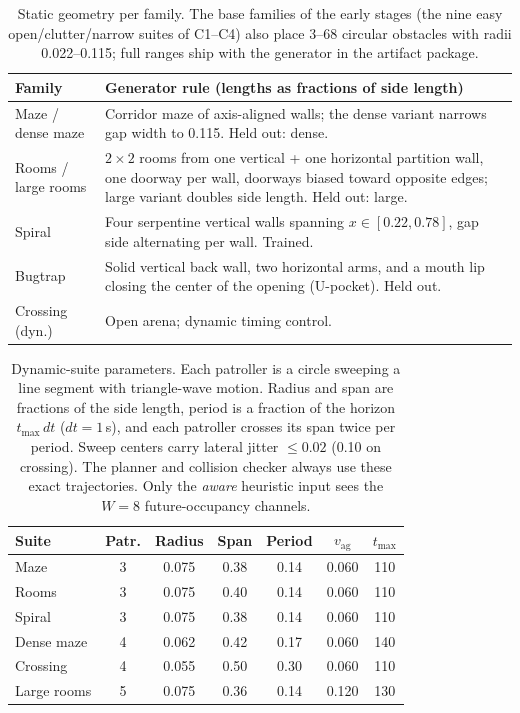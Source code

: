 \documentclass[letterpaper]{article} %
\newcommand{\stage}[1]{\textsc{#1}}
\begin{document}
\begin{table}[t]
\centering
\small
\setlength{\tabcolsep}{2.5pt}
\begin{tabular}{@{}lp{5.6cm}@{}}
\toprule
Family & Generator rule (lengths as fractions of side length) \\
\midrule
Maze / dense maze & Corridor maze of axis-aligned walls; the dense variant narrows gap width to 0.115. Held out: dense. \\
Rooms / large rooms & $2{\times}2$ rooms from one vertical + one horizontal partition wall, one doorway per wall, doorways biased toward opposite edges; large variant doubles side length. Held out: large. \\
Spiral & Four serpentine vertical walls spanning $x \in [0.22, 0.78]$, gap side alternating per wall. Trained. \\
Bugtrap & Solid vertical back wall, two horizontal arms, and a mouth lip closing the center of the opening (U-pocket). Held out. \\
Crossing (dyn.) & Open arena; dynamic timing control. \\
\bottomrule
\end{tabular}
\caption{Static geometry per family. The base families of the early stages (the nine easy open/clutter/narrow suites of \stage{C1}--\stage{C4}) also place 3--68 circular obstacles with radii 0.022--0.115; full ranges ship with the generator in the artifact package.}
\label{tab:envspec}
\end{table}

\begin{table}[t]
\centering
\small
\setlength{\tabcolsep}{2.5pt}
\begin{tabular}{@{}lcccccc@{}}
\toprule
Suite & Patr. & Radius & Span & Period & $v_{\mathrm{ag}}$ & $t_{\max}$ \\
\midrule
Maze & 3 & 0.075 & 0.38 & 0.14 & 0.060 & 110 \\
Rooms & 3 & 0.075 & 0.40 & 0.14 & 0.060 & 110 \\
Spiral & 3 & 0.075 & 0.38 & 0.14 & 0.060 & 110 \\
Dense maze & 4 & 0.062 & 0.42 & 0.17 & 0.060 & 140 \\
Crossing & 4 & 0.055 & 0.50 & 0.30 & 0.060 & 110 \\
Large rooms & 5 & 0.075 & 0.36 & 0.14 & 0.120 & 130 \\
\bottomrule
\end{tabular}
\caption{Dynamic-suite parameters. Each patroller is a circle sweeping a line segment with triangle-wave motion. Radius and span are fractions of the side length, period is a fraction of the horizon $t_{\max}\,dt$ ($dt{=}1$\,s), and each patroller crosses its span twice per period. Sweep centers carry lateral jitter $\leq 0.02$ (0.10 on crossing). The planner and collision checker always use these exact trajectories. Only the \emph{aware} heuristic input sees the $W{=}8$ future-occupancy channels.}
\label{tab:dynspec}
\end{table}
\end{document}

